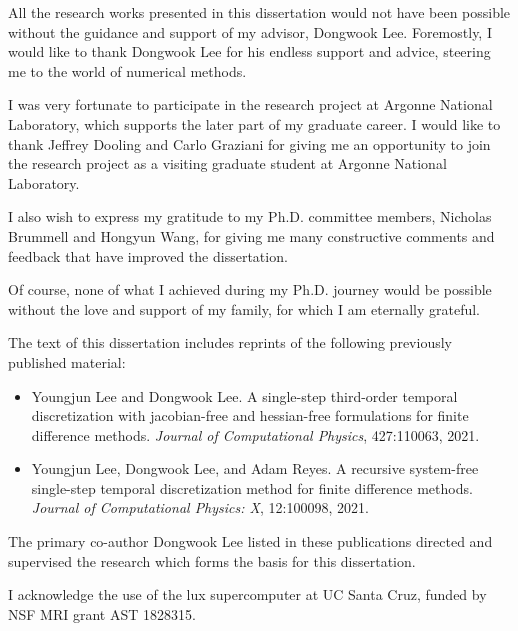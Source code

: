 All the research works presented in this dissertation would not have been possible without the guidance and support of my advisor, Dongwook Lee. Foremostly, I would like to thank Dongwook Lee for his endless support and advice, steering me to the world of numerical methods.

I was very fortunate to participate in the research project at Argonne National Laboratory, which supports the later part of my graduate career. I would like to thank Jeffrey Dooling and Carlo Graziani for giving me an opportunity to join the research project as a visiting graduate student at Argonne National Laboratory.

I also wish to express my gratitude to my Ph.D. committee members, Nicholas Brummell and Hongyun Wang, for giving me many constructive comments and feedback that have improved the dissertation.

Of course, none of what I achieved during my Ph.D. journey would be possible without the love and support of my family, for which I am eternally grateful. 

The text of this dissertation includes reprints of the following previously published material:
\begin{itemize}
    \item Youngjun Lee and Dongwook Lee. A single-step third-order temporal discretization with jacobian-free and hessian-free formulations for finite difference methods. \textit{Journal of Computational Physics}, 427:110063, 2021.
    \item Youngjun Lee, Dongwook Lee, and Adam Reyes. A recursive system-free single-step temporal discretization method for finite difference methods. \textit{Journal of Computational Physics: X}, 12:100098, 2021.
\end{itemize}
The primary co-author Dongwook Lee listed in these publications directed and supervised the research which forms the basis for this dissertation.

I acknowledge the use of the lux supercomputer at UC Santa Cruz, funded by NSF MRI grant AST 1828315.

